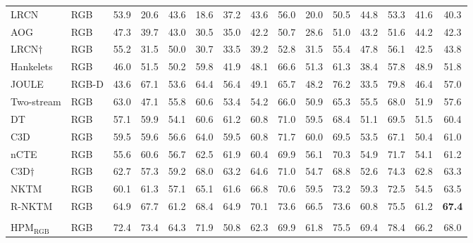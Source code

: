 \documentclass[twocolumn]{svjour3}          \smartqed  \usepackage{graphicx}
\begin{document}
\begin{table*}[t]
\begin{tabular}{llccccccccccccc}
LRCN & RGB & 53.9 & 20.6 & 43.6 & 18.6 & 37.2 & 43.6 & 56.0 & 20.0 & 50.5 & 44.8 & 53.3 & 41.6 & 40.3 \\

AOG & RGB & 47.3 & 39.7 & 43.0 & 30.5 & 35.0 & 42.2 & 50.7 & 28.6 & 51.0 & 43.2 & 51.6 & 44.2 & 42.3 \\ 

LRCN$\dagger$ & RGB & 55.2 & 31.5 & 50.0 & 30.7 & 33.5 & 39.2 & 52.8 & 31.5 & 55.4 & 47.8 & 56.1 & 42.5 & 43.8 \\

Hankelets & RGB & 46.0 & 51.5 & 50.2 & 59.8 & 41.9 & 48.1 & 66.6 & 51.3 & 61.3 & 38.4 & 57.8 & 48.9 & 51.8 \\ 

JOULE & RGB-D & 43.6 & 67.1 & 53.6 & 64.4 & 56.4 & 49.1 & 65.7 & 48.2 & 76.2 & 33.5 & 79.8 & 46.4 & 57.0 \\ 
       
Two-stream & RGB & 63.0 & 47.1 & 55.8 & 60.6 & 53.4 & 54.2 & 66.0 & 50.9 & 65.3 & 55.5 & 68.0 & 51.9 & 57.6 \\

DT & RGB & 57.1 & 59.9 & 54.1 & 60.6 & 61.2 & 60.8 & 71.0 & 59.5 & 68.4 & 51.1 & 69.5 & 51.5 & 60.4 \\ 
     
C3D & RGB & 59.5 & 59.6 & 56.6 & 64.0 & 59.5 & 60.8 & 71.7 & 60.0 & 69.5 & 53.5 & 67.1 & 50.4 & 61.0 \\

nCTE & RGB & 55.6 & 60.6 & 56.7 & 62.5 & 61.9 & 60.4 & 69.9 & 56.1 & 70.3 & 54.9 & 71.7 & 54.1 & 61.2 \\ 

C3D$\dagger$ & RGB & 62.7 & 57.3 & 59.2 & 68.0 & 63.2 & 64.6 & 71.0 & 54.7 & 68.8 & 52.6 & 74.3 & 62.8 & 63.3 \\

NKTM & RGB & 60.1 & 61.3 & 57.1 & 65.1 & 61.6 & 66.8 & 70.6 & 59.5 & 73.2 & 59.3 & 72.5 & 54.5 & 63.5 \\ 

R-NKTM & RGB & 64.9 & 67.7 & 61.2 & 68.4 & 64.9 & 70.1 & 73.6 & 66.5 & 73.6 & 60.8 & 75.5 & 61.2 & \textbf{67.4} \\

\noalign{\smallskip}\hline\noalign{\smallskip}
\multicolumn{ 15}{c}{\textbf{Proposed}} \\
\noalign{\smallskip}\hline\noalign{\smallskip}


HPM$_{\mathrm{RGB}}$ & RGB & 72.4 & 73.4 & 64.3 & 71.9 & 50.8 & 62.3 & 69.9 & 61.8 & 75.5 & 69.4 & 78.4 & 66.2 & 68.0 \\ 


\end{tabular}
\end{table*}
\end{document}
